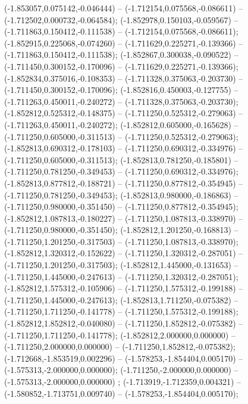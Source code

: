  (-1.853057,0.075142,-0.046444) -- (-1.712154,0.075568,-0.086611) -- (-1.712502,0.000732,-0.064584);
 (-1.852978,0.150103,-0.059567) -- (-1.711863,0.150412,-0.111538) -- (-1.712154,0.075568,-0.086611);
 (-1.852915,0.225068,-0.074260) -- (-1.711629,0.225271,-0.139366) -- (-1.711863,0.150412,-0.111538);
 (-1.852867,0.300038,-0.090522) -- (-1.711450,0.300152,-0.170096) -- (-1.711629,0.225271,-0.139366);
 (-1.852834,0.375016,-0.108353) -- (-1.711328,0.375063,-0.203730) -- (-1.711450,0.300152,-0.170096);
 (-1.852816,0.450003,-0.127755) -- (-1.711263,0.450011,-0.240272) -- (-1.711328,0.375063,-0.203730);
 (-1.852812,0.525312,-0.148375) -- (-1.711250,0.525312,-0.279063) -- (-1.711263,0.450011,-0.240272);
 (-1.852812,0.605000,-0.165628) -- (-1.711250,0.605000,-0.311513) -- (-1.711250,0.525312,-0.279063);
 (-1.852813,0.690312,-0.178103) -- (-1.711250,0.690312,-0.334976) -- (-1.711250,0.605000,-0.311513);
 (-1.852813,0.781250,-0.185801) -- (-1.711250,0.781250,-0.349453) -- (-1.711250,0.690312,-0.334976);
 (-1.852813,0.877812,-0.188721) -- (-1.711250,0.877812,-0.354945) -- (-1.711250,0.781250,-0.349453);
 (-1.852813,0.980000,-0.186863) -- (-1.711250,0.980000,-0.351450) -- (-1.711250,0.877812,-0.354945);
 (-1.852812,1.087813,-0.180227) -- (-1.711250,1.087813,-0.338970) -- (-1.711250,0.980000,-0.351450);
 (-1.852812,1.201250,-0.168813) -- (-1.711250,1.201250,-0.317503) -- (-1.711250,1.087813,-0.338970);
 (-1.852812,1.320312,-0.152622) -- (-1.711250,1.320312,-0.287051) -- (-1.711250,1.201250,-0.317503);
 (-1.852812,1.445000,-0.131653) -- (-1.711250,1.445000,-0.247613) -- (-1.711250,1.320312,-0.287051);
 (-1.852812,1.575312,-0.105906) -- (-1.711250,1.575312,-0.199188) -- (-1.711250,1.445000,-0.247613);
 (-1.852813,1.711250,-0.075382) -- (-1.711250,1.711250,-0.141778) -- (-1.711250,1.575312,-0.199188);
 (-1.852812,1.852812,-0.040080) -- (-1.711250,1.852812,-0.075382) -- (-1.711250,1.711250,-0.141778);
 (-1.852812,2.000000,0.000000) -- (-1.711250,2.000000,0.000000) -- (-1.711250,1.852812,-0.075382);
 (-1.712668,-1.853519,0.002296) -- (-1.578253,-1.854404,0.005170) -- (-1.575313,-2.000000,0.000000);
 (-1.711250,-2.000000,0.000000) -- (-1.575313,-2.000000,0.000000) ;
 (-1.713919,-1.712359,0.004321) -- (-1.580852,-1.713751,0.009740) -- (-1.578253,-1.854404,0.005170);
